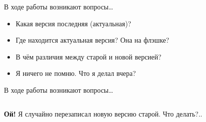 \documentclass[presentation]{beamer}
\begin{document}
\begin{frame}{В ходе работы возникают вопросы\ldots{}}
  \begin{itemize}
  \item Какая версия последняя (актуальная)?
  \item Где находится актуальная версия?  Она на флэшке?
  \item В чём различия между старой и новой версией?
  \item Я ничего не помню.  Что я делал вчера?
  \end{itemize}
\end{frame}

\begin{frame}{В ходе работы возникают вопросы\ldots{}}
  \begin{columns}
    \begin{column}{0.6\textwidth}
      \huge{\textbf{Ой!}  Я случайно перезаписал новую версию старой.\newline
        Что делать?..}
    \end{column}
    \begin{column}{0.4\textwidth}
      \begin{figure}[htb]
        \centering

\end{figure}
\end{column}
\end{columns}
\end{frame}
\end{document}
